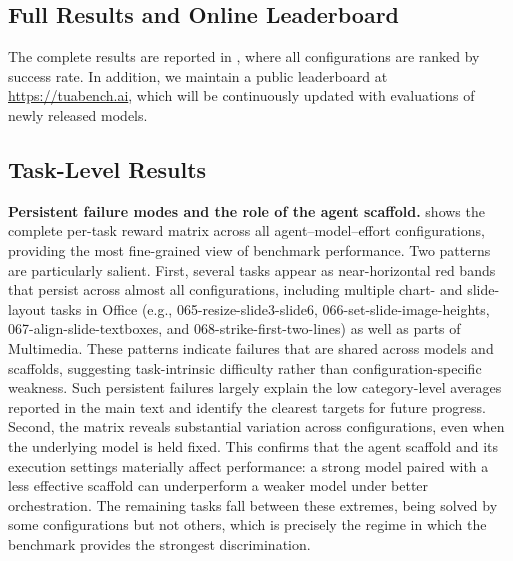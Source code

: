 \documentclass{llmxive}
\begin{document}
\subsection{Full Results and Online Leaderboard}
The complete results are reported in , where all configurations are ranked by success rate. In addition, we maintain a public leaderboard at \url{https://tuabench.ai}, which will be continuously updated with evaluations of newly released models.


\subsection{Task-Level Results}
\noindent\textbf{Persistent failure modes and the role of the agent scaffold.}
 shows the complete per-task reward matrix across all agent--model--effort configurations, providing the most fine-grained view of benchmark performance. Two patterns are particularly salient. First, several tasks appear as near-horizontal red bands that persist across almost all configurations, including multiple chart- and slide-layout tasks in Office (e.g., 065-resize-slide3-slide6, 066-set-slide-image-heights, 067-align-slide-textboxes, and 068-strike-first-two-lines) as well as parts of Multimedia. These patterns indicate failures that are shared across models and scaffolds, suggesting task-intrinsic difficulty rather than configuration-specific weakness. Such persistent failures largely explain the low category-level averages reported in the main text and identify the clearest targets for future progress. Second, the matrix reveals substantial variation across configurations, even when the underlying model is held fixed. This confirms that the agent scaffold and its execution settings materially affect performance: a strong model paired with a less effective scaffold can underperform a weaker model under better orchestration. The remaining tasks fall between these extremes, being solved by some configurations but not others, which is precisely the regime in which the benchmark provides the strongest discrimination.
\end{document}
